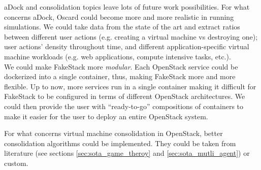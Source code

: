 aDock and consolidation topics leave lots of future work possibilities. For what concerns aDock, Oscard could become more and more realistic in running simulations. We could take data from the state of the art and extract ratios between different user actions (e.g. creating a virtual machine vs destroying one); user actions' density throughout time, and different application-specific virtual machine workloads (e.g. web applications, compute intensive tasks, etc.).\\
We could make FakeStack more \emph{modular}. Each OpenStack service could be dockerized into a single container, thus, making FakeStack more and more flexible. Up to now, more services run in a single container making it difficult for FakeStack to be configured in terms of different OpenStack architectures. We could then provide the user with ``ready-to-go'' compositions of containers to make it easier for the user to deploy an entire OpenStack system.

For what concerns virtual machine consolidation in OpenStack, better consolidation algorithms could be implemented. They could be taken from literature (see sections \ref{sec:sota_game_theroy} and \ref{sec:sota_mutli_agent}) or custom.